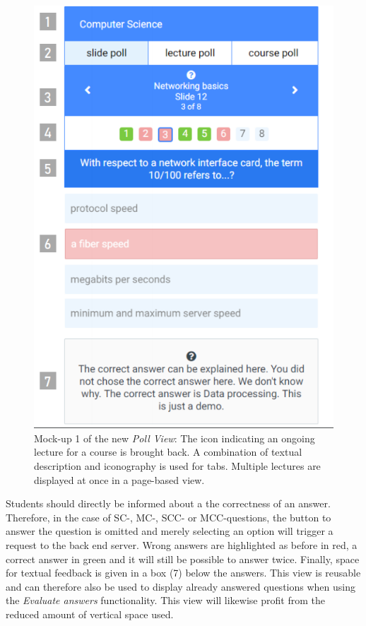 \begin{figure}
	\vspace*{-0.75cm}
	\begin{center}
		\includegraphics[width=.48\textwidth]{mockups/poll_view_enhancement.png}
	\end{center}
	\captionsetup{format=plain}
	\caption{Mock-up 1 of the new \emph{Poll View}:
		The icon indicating an ongoing lecture for a course is brought back.
		A combination of textual description and iconography is used for tabs.
		Multiple lectures are displayed at once in a page-based view.
	}
	\label{figure:pollviewenhanvement1}
	\vspace*{-0.75cm}
\end{figure}
Students should directly be informed about a the correctness of an answer.
Therefore, in the case of SC-, MC-, SCC- or MCC-questions, the button to answer the question is omitted and merely selecting an option will trigger a request to the back end server.
Wrong answers are highlighted as before in red, a correct answer in green and it will still be possible to answer twice. Finally, space for textual feedback is given in a box (7) below the answers. This view is reusable and can therefore also be used to display already answered questions when using the \emph{Evaluate answers} functionality. This view will likewise profit from the reduced amount of vertical space used. 
